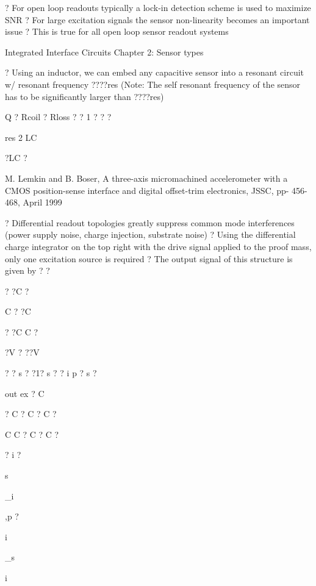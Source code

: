 \documentclass[2pt,landscape]{article}
\begin{document}
\begin{multicols*}{5}
?	For open loop readouts typically a lock-in 
detection scheme is used to maximize SNR
?	For large excitation signals the sensor 
non-linearity becomes an important 
issue
?	This is true for all open loop sensor 
readout systems




Integrated Interface Circuits \textbullet Chapter 2: Sensor types





?	Using an inductor, we can embed any capacitive sensor into a 
resonant circuit w/ resonant frequency ????res  (Note: The self resonant 
frequency of the sensor has to be significantly larger than ????res)




Q ?
Rcoil ? Rloss
?	? 1 ? ?	?

res	2	LC

?LC ?


M. Lemkin and B. Boser, \textbullet A three-axis micromachined 
accelerometer with a CMOS position-sense interface and 
digital offset-trim electronics, JSSC, pp- 456-468, April 
1999










?	Differential readout topologies greatly suppress common mode 
interferences (power supply noise, charge injection, substrate noise)
?	Using the differential charge integrator on the top right with the drive 
signal applied to the proof mass, only one excitation source is required
?	The output signal of this structure is given by
?	?


? ?C	?


C	?	?C


?	?C	C	?


?V	? ??V


? ?	s ? ?1?	s
? ?	i	p 
?	s	?


out	ex	? C


?	C ? C ? C ?


C	C ? C ? C ?


?	i	?


\textbullet \textbullet s


\_\textbullet i


\textbullet \textbullet ,p ?


\textbullet \textbullet i


\textbullet \textbullet \_\textbullet s


\textbullet \textbullet i



\end{multicols*}
\end{document}
